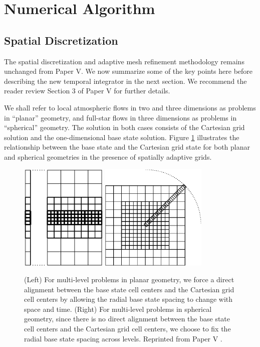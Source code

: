 \section{Numerical Algorithm}\label{sec:algorithm}
\subsection{Spatial Discretization}\label{Sec:Spatial}
The spatial discretization and adaptive mesh refinement methodology remains unchanged from Paper V.
We now summarize some of the key points here before describing the new temporal integrator in the next section.
We recommend the reader review Section 3 of Paper V for further details.

We shall refer to local atmospheric flows in two and three dimensions as problems in ``planar'' geometry, and full-star flows
in three dimensions as problems in ``spherical'' geometry.
The solution in both cases consists of the Cartesian grid solution
and the one-dimensional base state solution.
Figure \ref{Fig:BaseGrid} illustrates the relationship between the base state and the Cartesian grid state for both planar and spherical geometries in the presence of spatially adaptive grids. 
\begin{figure}[tb]
\centering
\includegraphics[height=2.0in]{./figs/base_grid} \hspace{0.5in}
\includegraphics[height=2.0in]{./figs/base_spherical}
\caption{\label{Fig:BaseGrid}  
(Left) For multi-level problems in planar geometry, we force a direct alignment
between the base state cell centers and the Cartesian grid cell centers by 
allowing the radial base state spacing to change with space and time.
(Right) For multi-level problems in spherical geometry, since there is no direct alignment
between the base state cell centers and the Cartesian grid cell centers, we choose to fix
the radial base state spacing across levels. Reprinted from Paper V \citep{MAESTRO_V}. }
\end{figure}
